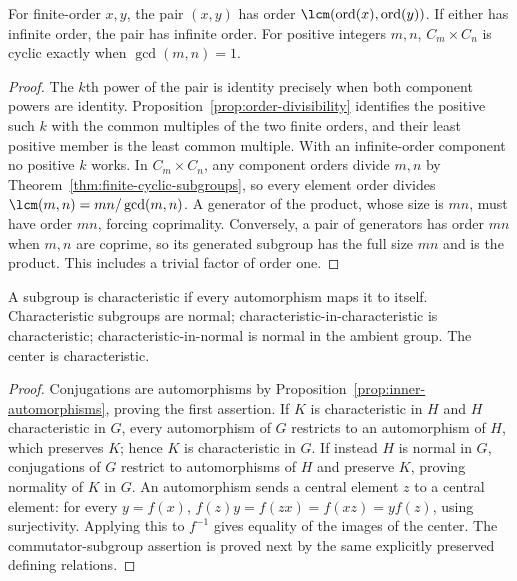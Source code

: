 \begin{proposition}\label{prop:product-orders}
For finite-order $x,y$, the pair $(x,y)$ has order $\lcm(\operatorname{ord}(x),\operatorname{ord}(y))$. If either has infinite order, the pair has infinite order. For positive integers $m,n$, $C_m\times C_n$ is cyclic exactly when $\gcd(m,n)=1$.
\end{proposition}
\begin{proof}
The $k$th power of the pair is identity precisely when both component powers are identity. Proposition~\ref{prop:order-divisibility} identifies the positive such $k$ with the common multiples of the two finite orders, and their least positive member is the least common multiple. With an infinite-order component no positive $k$ works. In $C_m\times C_n$, any component orders divide $m,n$ by Theorem~\ref{thm:finite-cyclic-subgroups}, so every element order divides $\lcm(m,n)=mn/\gcd(m,n)$. A generator of the product, whose size is $mn$, must have order $mn$, forcing coprimality. Conversely, a pair of generators has order $mn$ when $m,n$ are coprime, so its generated subgroup has the full size $mn$ and is the product. This includes a trivial factor of order one.
\end{proof}

\begin{proposition}\label{prop:characteristic}
A subgroup is characteristic if every automorphism maps it to itself. Characteristic subgroups are normal; characteristic-in-characteristic is characteristic; characteristic-in-normal is normal in the ambient group. The center is characteristic.
\end{proposition}
\begin{proof}
Conjugations are automorphisms by Proposition~\ref{prop:inner-automorphisms}, proving the first assertion. If $K$ is characteristic in $H$ and $H$ characteristic in $G$, every automorphism of $G$ restricts to an automorphism of $H$, which preserves $K$; hence $K$ is characteristic in $G$. If instead $H$ is normal in $G$, conjugations of $G$ restrict to automorphisms of $H$ and preserve $K$, proving normality of $K$ in $G$. An automorphism sends a central element $z$ to a central element: for every $y=f(x)$, $f(z)y=f(zx)=f(xz)=yf(z)$, using surjectivity. Applying this to $f^{-1}$ gives equality of the images of the center. The commutator-subgroup assertion is proved next by the same explicitly preserved defining relations.
\end{proof}

